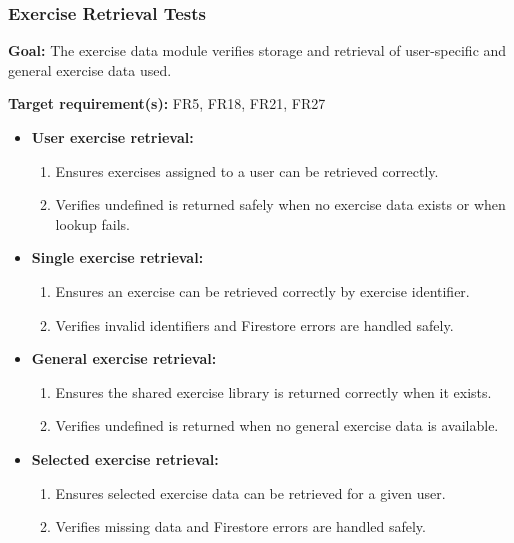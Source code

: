\documentclass[12pt, titlepage]{article}
\begin{document}
\subsubsection{Exercise Retrieval Tests}

\textbf{Goal:} The exercise data module verifies storage and retrieval of user-specific and general exercise data used.

\textbf{Target requirement(s):} FR5, FR18, FR21, FR27

\begin{itemize}
    \item \textbf{User exercise retrieval:}
    \begin{enumerate}
        \item Ensures exercises assigned to a user can be retrieved correctly.
        \item Verifies undefined is returned safely when no exercise data exists or when lookup fails.
    \end{enumerate}

    \item \textbf{Single exercise retrieval:}
    \begin{enumerate}
        \item Ensures an exercise can be retrieved correctly by exercise identifier.
        \item Verifies invalid identifiers and Firestore errors are handled safely.
    \end{enumerate}

    \item \textbf{General exercise retrieval:}
    \begin{enumerate}
        \item Ensures the shared exercise library is returned correctly when it exists.
        \item Verifies undefined is returned when no general exercise data is available.
    \end{enumerate}

    \item \textbf{Selected exercise retrieval:}
    \begin{enumerate}
        \item Ensures selected exercise data can be retrieved for a given user.
        \item Verifies missing data and Firestore errors are handled safely.
    \end{enumerate}
\end{itemize}
\end{document}
